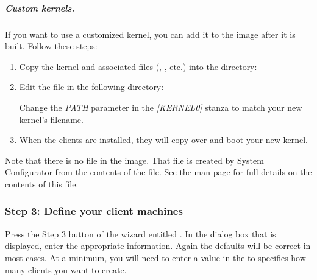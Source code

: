\subparagraph{Custom kernels.}

If you want to use a customized kernel, you can add it to the image
after it is built. Follow these steps:

\begin{enumerate}
\item Copy the kernel and associated files (,
  , etc.) into the directory:

  \vspace{11pt}
  \centerline{}

\item Edit the  file in the following
  directory:

  \vspace{11pt}
  \centerline{}
  \vspace{11pt}
  
  Change the \emph{PATH} parameter in the \emph{[KERNEL0]} stanza to
  match your new kernel's filename.

\item When the clients are installed, they will copy over and boot
  your new kernel.
\end{enumerate}

Note that there is no  file in the image. That file is
created by System Configurator from the contents of the
 file. See the 
man page for full details on the contents of this file.


\subsubsection{Step 3: Define your client machines} 
\label{det:defclients}

Press the Step 3 button of the wizard entitled . In the dialog box that is displayed, enter the appropriate
information. Again the defaults will be correct in most cases. At a
minimum, you will need to enter a value in the 
to specifies how many clients you want to create.

